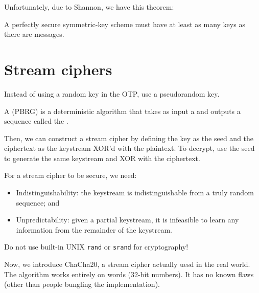 \documentclass[class=co487,tikz,notes]{agony}
\begin{document}
Unfortunately, due to Shannon, we have this theorem:

\begin{theorem}
  A perfectly secure symmetric-key scheme must have
  at least as many keys as there are messages.
\end{theorem}

\section{Stream ciphers}

Instead of using a random key in the OTP, use a pseudorandom key.

\begin{defn}[pseudorandomness]
  A  (PBRG) is a deterministic algorithm
  that takes as input a  and outputs a  sequence called
  the .
\end{defn}

Then, we can construct a stream cipher by defining the key as the seed
and the ciphertext as the keystream XOR'd with the plaintext.
To decrypt, use the seed to generate the same keystream and XOR with the ciphertext.

For a stream cipher to be secure, we need:
\begin{itemize}
  \item Indistinguishability: the keystream is indistinguishable from a
        truly random sequence; and
  \item Unpredictability: given a partial keystream, it is infeasible to learn
        any information from the remainder of the keystream.
\end{itemize}

\begin{remark}
  Do not use built-in UNIX \texttt{rand} or \texttt{srand} for cryptography!
\end{remark}

Now, we introduce ChaCha20, a stream cipher actually uesd in the real world.
The algorithm works entirely on words (32-bit numbers).
It has no known flaws (other than people bungling the implementation).
\end{document}
